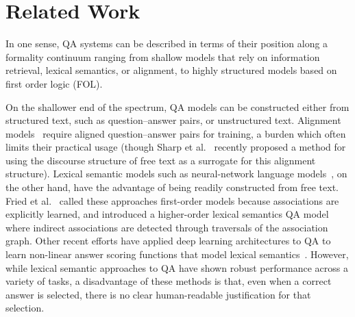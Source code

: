 \section{Related Work}
\label{sec:relatedwork}

In one sense, QA systems can be described in terms of their position along a formality continuum ranging from shallow models that rely on information retrieval, lexical semantics, or alignment, to highly structured models based on first order logic (FOL).  

On the shallower end of the spectrum,  QA models can be constructed either from structured text, such as question--answer pairs, or unstructured text.  Alignment models~\cite{Berger:00,echihabi2003noisy,Soricut:06,Riezler:etal:2007,Surdeanu:11,yao2013}  require aligned question--answer pairs for training, a burden which often limits their practical usage (though Sharp et al.~ recently proposed a method for using the discourse structure of free text as a surrogate for this alignment structure).
Lexical semantic models such as neural-network language models~\cite{jansen14,sultan-etal:2014:TACL,yih13}, on the other hand, have the advantage of being readily constructed from free text.  
Fried et al.~ called these approaches first-order models because associations are explicitly learned, and introduced a higher-order lexical semantics QA model where indirect associations are detected through traversals of the association graph.  
Other recent efforts have applied deep learning architectures to QA to learn non-linear answer scoring functions that model lexical semantics~\cite{Iyyer2014,nips15_hermann}.
However, while lexical semantic approaches to QA have shown robust performance across a variety of tasks, a disadvantage of these methods is that, even when a correct answer is selected, there is no clear human-readable justification for that selection.   

